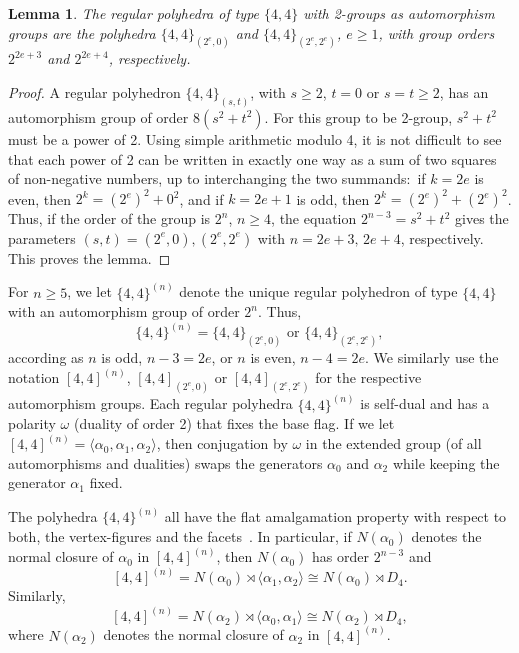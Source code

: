 \documentclass[10pt,a4paper]{amsart}
\newtheorem{lemma}[theorem]{Lemma}
\theoremstyle{definition}
\begin{document}
\begin{lemma}
\label{lem44}
The regular polyhedra of type $\{4,4\}$ with 2-groups as automorphism groups are the polyhedra $\{4,4\}_{(2^e,0)}$ and $\{4,4\}_{(2^e,2^e)}$, $e\geq 1$, with group orders $2^{2e+3}$ and $2^{2e+4}$, respectively. 
\end{lemma}

\begin{proof}
A regular polyhedron $\{4,4\}_{(s,t)}$, with $s\geq 2$, $t=0$ or $s=t\geq 2$, has an automorphism group of order $8(s^2+t^2)$. For this group to be 2-group, $s^2+t^2$ must be a power of 2. Using simple arithmetic modulo 4, it is not difficult to see that each power of 2 can be written in exactly one way as a sum of two squares of non-negative numbers, up to interchanging the two summands:\ if $k=2e$ is even, then $2^k = (2^e)^2 +0^2$, and if $k=2e+1$ is odd, then $2^k = (2^e)^2 +(2^e)^2$. Thus, if the order of the group is $2^n$, $n\geq 4$, the equation $2^{n-3}=s^2+t^2$ gives the parameters $(s,t)=(2^e,0),(2^e,2^e)$ with $n=2e+3,\,2e+4$, respectively. This proves the lemma.
\end{proof}

For $n\geq 5$, we let $\{4,4\}^{(n)}$ denote the unique regular polyhedron of type $\{4,4\}$ with an automorphism group of order $2^n$. Thus, 
\begin{equation} 
\{4,4\}^{(n)}=\{4,4\}_{(2^e,0)}\mbox{ or }\{4,4\}_{(2^e,2^e)},
\end{equation} 
according as $n$ is odd, $n-3=2e$, or $n$ is even, $n-4=2e$. We similarly use the notation $[4,4]^{(n)}$, $[4,4]_{(2^e,0)}$ or $[4,4]_{(2^e,2^e)}$ for the respective automorphism groups. Each regular polyhedra $\{4,4\}^{(n)}$ is self-dual and has a polarity $\omega$ (duality of order 2) that fixes the base flag. If we let $[4,4]^{(n)} = \langle\alpha_0,\alpha_1,\alpha_2\rangle$, then conjugation by $\omega$ in the extended group (of all automorphisms and dualities) swaps the generators $\alpha_0$ and $\alpha_2$ while keeping the generator $\alpha_1$ fixed.

The polyhedra $\{4,4\}^{(n)}$ all have the flat amalgamation property with respect to both, the vertex-figures and the facets~\cite{Sch1988}. In particular, if $N(\alpha_0)$ denotes the normal closure of $\alpha_0$ in $[4,4]^{(n)}$, then $N(\alpha_0)$ has order $2^{n-3}$ and
\begin{equation}
\label{torfap1}
[4,4]^{(n)} = N(\alpha_0)\rtimes\langle\alpha_1,\alpha_2\rangle 
\cong N(\alpha_0) \rtimes D_4 .
\end{equation}
Similarly, 
\begin{equation}
\label{torfap2}
[4,4]^{(n)} = N(\alpha_2)\rtimes\langle\alpha_0,\alpha_1\rangle 
\cong N(\alpha_2)\rtimes D_4 ,
\end{equation}
where $N(\alpha_2)$ denotes the normal closure of $\alpha_2$ in $[4,4]^{(n)}$.
\medskip
\end{document}
